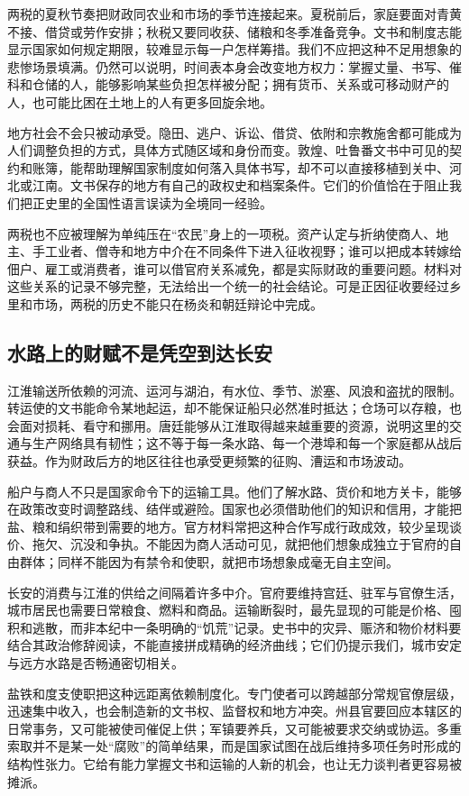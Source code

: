 两税的夏秋节奏把财政同农业和市场的季节连接起来。夏税前后，家庭要面对青黄不接、借贷或劳作安排；秋税又要同收获、储粮和冬季准备竞争。文书和制度志能显示国家如何规定期限，较难显示每一户怎样筹措。我们不应把这种不足用想象的悲惨场景填满。仍然可以说明，时间表本身会改变地方权力：掌握丈量、书写、催科和仓储的人，能够影响某些负担怎样被分配；拥有货币、关系或可移动财产的人，也可能比困在土地上的人有更多回旋余地。

地方社会不会只被动承受。隐田、逃户、诉讼、借贷、依附和宗教施舍都可能成为人们调整负担的方式，具体方式随区域和身份而变。敦煌、吐鲁番文书中可见的契约和账簿，能帮助理解国家制度如何落入具体书写，却不可以直接移植到关中、河北或江南。文书保存的地方有自己的政权史和档案条件。它们的价值恰在于阻止我们把正史里的全国性语言误读为全境同一经验。

两税也不应被理解为单纯压在“农民”身上的一项税。资产认定与折纳使商人、地主、手工业者、僧寺和地方中介在不同条件下进入征收视野；谁可以把成本转嫁给佃户、雇工或消费者，谁可以借官府关系减免，都是实际财政的重要问题。材料对这些关系的记录不够完整，无法给出一个统一的社会结论。可是正因征收要经过乡里和市场，两税的历史不能只在杨炎和朝廷辩论中完成。

\subsection{水路上的财赋不是凭空到达长安}
江淮输送所依赖的河流、运河与湖泊，有水位、季节、淤塞、风浪和盗扰的限制。转运使的文书能命令某地起运，却不能保证船只必然准时抵达；仓场可以存粮，也会面对损耗、看守和挪用。唐廷能够从江淮取得越来越重要的资源，说明这里的交通与生产网络具有韧性；这不等于每一条水路、每一个港埠和每一个家庭都从战后获益。作为财政后方的地区往往也承受更频繁的征购、漕运和市场波动。

船户与商人不只是国家命令下的运输工具。他们了解水路、货价和地方关卡，能够在政策改变时调整路线、结伴或避险。国家也必须借助他们的知识和信用，才能把盐、粮和绢织带到需要的地方。官方材料常把这种合作写成行政成效，较少呈现谈价、拖欠、沉没和争执。不能因为商人活动可见，就把他们想象成独立于官府的自由群体；同样不能因为有禁令和使职，就把市场想象成毫无自主空间。

长安的消费与江淮的供给之间隔着许多中介。官府要维持宫廷、驻军与官僚生活，城市居民也需要日常粮食、燃料和商品。运输断裂时，最先显现的可能是价格、囤积和逃散，而非本纪中一条明确的“饥荒”记录。史书中的灾异、赈济和物价材料要结合其政治修辞阅读，不能直接拼成精确的经济曲线；它们仍提示我们，城市安定与远方水路是否畅通密切相关。

盐铁和度支使职把这种远距离依赖制度化。专门使者可以跨越部分常规官僚层级，迅速集中收入，也会制造新的文书权、监督权和地方冲突。州县官要回应本辖区的日常事务，又可能被使司催促上供；军镇要养兵，又可能被要求交纳或协运。多重索取并不是某一处“腐败”的简单结果，而是国家试图在战后维持多项任务时形成的结构性张力。它给有能力掌握文书和运输的人新的机会，也让无力谈判者更容易被摊派。


